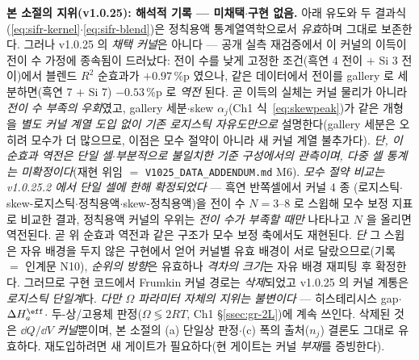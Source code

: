 \begin{warnbox}
\textbf{본 소절의 지위(v1.0.25): 해석적 기록 --- 미채택$\cdot$구현 없음.} 아래 유도와 두 결과식
(\eqref{eq:sifr-kernel}$\cdot$\eqref{eq:sifr-blend})은 정칙용액 통계열역학으로서 \emph{유효}하며 그대로
보존한다. 그러나 v1.0.25 의 \emph{채택 커널}은 아니다 --- 공개 실측 재검증에서 이 커널의 이득이 전이 수
가정에 종속됨이 드러났다: 전이 수를 낮게 고정한 조건(흑연 4 전이 $+$ Si 3 전이)에서 블렌드 $R^2$ 순효과가
$+0.97$\,\%p 였으나, 같은 데이터에서 전이를 gallery 로 세분하면(흑연 7 $+$ Si 7) $-0.53$\,\%p 로 \emph{역전}
된다. 곧 이득의 실체는 커널 물리가 아니라 \emph{전이 수 부족의 우회}였고, gallery 세분$\cdot$skew
$\alpha_j$(Ch1 식~\eqref{eq:skewpeak})가 같은 개형을 \emph{별도 커널 계열 도입 없이 기존 로지스틱
자유도만으로} 설명한다(gallery 세분은 오히려 모수가 더 많으므로, 이점은 모수 절약이 아니라 새 커널
계열 불추가다). \emph{단, 이 순효과 역전은 단일 셀$\cdot$부분적으로 불일치한 기준 구성에서의 관측이며,
다중 셀 통계는 미확정이다}(재현 위임 $=$ \texttt{V1025\_DATA\_ADDENDUM.md} M6).
\emph{모수 절약 비교는 v1.0.25.2 에서 단일 셀에 한해 확정되었다} --- 흑연 반쪽셀에서 커널 4 종
(로지스틱$\cdot$skew-로지스틱$\cdot$정칙용액$\cdot$skew-정칙용액)을 전이 수 $N{=}3$--$8$ 로 스윕해
모수 보정 지표로 비교한 결과, 정칙용액 커널의 우위는 \emph{전이 수가 부족할 때만} 나타나고 $N$ 을 올리면
역전된다. 곧 위 순효과 역전과 같은 구조가 모수 보정 축에서도 재현된다. \emph{단} 그 스윕은 자유 배경을
두지 않은 구현에서 얻어 커널별 유효 배경이 서로 달랐으므로(기록 $=$ 인계문 N10), \emph{순위의 방향}은
유효하나 \emph{격차의 크기}는 자유 배경 재피팅 후 확정한다.
그러므로 구현 코드에서
Frumkin 커널 경로는 \emph{삭제}되었고 v1.0.25 의 커널 계통은 \emph{로지스틱 단일계}다.
\emph{다만 $\Omega$ 파라미터 자체의 지위는 불변이다} --- 히스테리시스 gap$\cdot$$\Delta H_a^\eff$$\cdot$
두-상/고용체 판정($\Omega\lessgtr2RT$, Ch1 \S\ref{ssec:gr-2L})에 계속 쓰인다. 삭제된 것은 $\dd Q/\dd V$
\emph{커널}뿐이며, 본 소절의 (a) 단일상 판정$\cdot$(c) 폭의 출처($n_j$) 결론도 그대로 유효하다.
재도입하려면 새 게이트가 필요하다(현 게이트는 커널 \emph{부재}를 증빙한다).
\end{warnbox}

